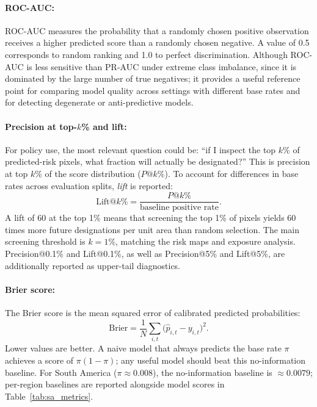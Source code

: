 \documentclass[12pt]{article}
\theoremstyle{break}
\begin{document}
\paragraph{ROC-AUC:}
ROC-AUC measures the probability that a randomly chosen positive observation receives
a higher predicted score than a randomly chosen negative. A value of 0.5 corresponds
to random ranking and 1.0 to perfect discrimination. Although ROC-AUC is less
sensitive than PR-AUC under extreme class imbalance, since it is dominated by the large
number of true negatives; it provides a useful reference point for comparing model
quality across settings with different base rates and for detecting degenerate or
anti-predictive models.

\paragraph{Precision at top-$k$\% and lift:}
For policy use, the most relevant question could be: ``if I inspect the top $k$\% of
predicted-risk pixels, what fraction will actually be designated?'' This is precision
at top $k$\% of the score distribution ($P@k\%$). To account for differences in
base rates across evaluation splits, \emph{lift} is reported:
\begin{equation}
  \text{Lift}@k\% = \frac{P@k\%}{\text{baseline positive rate}}.
\end{equation}
A lift of 60 at the top 1\% means that screening the top 1\% of pixels yields 60
times more future designations per unit area than random selection. The main
screening threshold is $k = 1\%$, matching the risk maps and exposure analysis.
Precision@0.1\% and Lift@0.1\%, as well as Precision@5\% and Lift@5\%, are 
additionally reported as upper-tail diagnostics.

\paragraph{Brier score:}
The Brier score \citep{brier1950} is the mean squared error of calibrated predicted
probabilities:
\begin{equation}
  \text{Brier} = \frac{1}{N} \sum_{i,t} \bigl(\hat{p}_{i,t} - y_{i,t}\bigr)^2.
\end{equation}
Lower values are better. A naive model that always predicts the base rate $\pi$
achieves a score of $\pi(1 - \pi)$; any useful model should beat this no-information
baseline. For South America ($\pi \approx 0.008$), the no-information baseline is
$\approx 0.0079$; per-region baselines are reported alongside model scores in
Table~\ref{tab:sa_metrics}.
\end{document}
